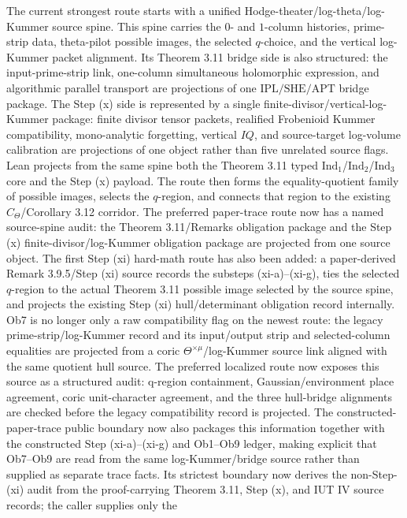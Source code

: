 \documentclass[11pt]{article}
\newcommand{\CTheta}{C_\Theta}
\newcommand{\IndOne}{\ensuremath{\mathrm{Ind}_1}}
\newcommand{\IndTwo}{\ensuremath{\mathrm{Ind}_2}}
\newcommand{\IndThree}{\ensuremath{\mathrm{Ind}_3}}
\newcommand{\SHE}{\ensuremath{\mathrm{SHE}}}
\newcommand{\IPL}{\ensuremath{\mathrm{IPL}}}
\newcommand{\APT}{\ensuremath{\mathrm{APT}}}
\theoremstyle{plain}
\theoremstyle{definition}
\theoremstyle{remark}
\begin{document}
The current strongest route starts with a unified Hodge-theater/log-theta/log-
Kummer source spine.  This spine carries the \(0\)- and \(1\)-column histories,
prime-strip data, theta-pilot possible images, the selected \(q\)-choice, and
the vertical log-Kummer packet alignment.  Its Theorem 3.11 bridge side is
also structured: the input-prime-strip link, one-column simultaneous
holomorphic expression, and algorithmic parallel transport are projections of
one \(\IPL/\SHE/\APT\) bridge package.  The Step (x) side is represented by a
single finite-divisor/vertical-log-Kummer package: finite divisor tensor
packets, realified Frobenioid Kummer compatibility, mono-analytic forgetting,
vertical \(IQ\), and source-target log-volume calibration are projections of
one object rather than five unrelated source flags.  Lean projects from the
same spine both the Theorem 3.11 typed \IndOne/\IndTwo/\IndThree{} core and
the Step (x) payload.  The route then forms the equality-quotient family of
possible images, selects the \(q\)-region, and connects that region to the
existing \(\CTheta\)/Corollary 3.12 corridor.  The preferred paper-trace route
now has a named source-spine audit: the Theorem 3.11/Remarks obligation package
and the Step (x) finite-divisor/log-Kummer obligation package are projected from
one source object.  The first Step (xi) hard-math route has also been added:
a paper-derived Remark 3.9.5/Step (xi) source records the substeps
(xi-a)--(xi-g), ties the selected \(q\)-region to the actual Theorem 3.11
possible image selected by the source spine, and projects the existing
Step (xi) hull/determinant obligation record internally.  Ob7 is no longer
only a raw compatibility flag on the newest route: the legacy
prime-strip/log-Kummer record and its input/output strip and selected-column
equalities are projected from a coric \(\Theta^{\times\mu}\)/log-Kummer source
link aligned with the same quotient hull source.  The preferred localized
route now exposes this source as a structured audit: q-region containment,
Gaussian/environment place agreement, coric unit-character agreement, and the
three hull-bridge alignments are checked before the legacy compatibility
record is projected.  The constructed-paper-trace public boundary now also
packages this information together with the constructed Step (xi-a)--(xi-g)
and Ob1--Ob9 ledger, making explicit that Ob7--Ob9 are read from the same
log-Kummer/bridge source rather than supplied as separate trace facts.  Its
strictest boundary now derives the non-Step-(xi) audit from the proof-carrying
Theorem 3.11, Step (x), and IUT IV source records; the caller supplies only the
\end{document}
